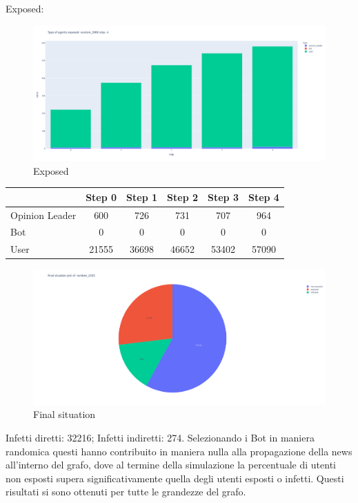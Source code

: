         Exposed:
        \begin{figure}[H]
            \includegraphics[width=16cm]{resources/charts/random_2000_bar.png}
            \caption{Exposed}
            \label{fig:random_2000_bar}
        \end{figure}
        
        \begin{table}[H]
            \centering
            \begin{tabular}{|l|c|c|c|c|c|}
            \hline
                           & Step 0 & Step 1 & Step 2 & Step 3 & Step 4 \\ \hline
            Opinion Leader & 600    & 726    & 731    & 707    & 964    \\ \hline
            Bot            & 0      & 0      & 0      & 0      & 0      \\ \hline
            User           & 21555  & 36698  & 46652  & 53402  & 57090  \\ \hline
            \end{tabular}
        \end{table}
        
               
        \begin{figure}[H]
            \includegraphics[width=16cm]{resources/charts/random_2000_pie.png}
            \caption{Final situation}
            \label{fig:random_2000_pie}
        \end{figure}
        Infetti diretti: 32216; \newline
        Infetti indiretti: 274.
        \newline \newline
        Selezionando i Bot in maniera randomica questi hanno contribuito in maniera nulla alla propagazione della news all’interno del grafo, dove al termine della simulazione la percentuale di utenti non esposti supera significativamente quella degli utenti esposti o infetti.
        Questi risultati si sono ottenuti per tutte le grandezze del grafo.



